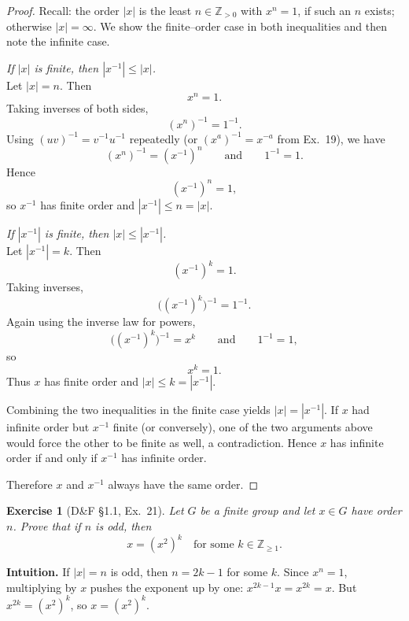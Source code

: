 \documentclass[12pt]{article}
\newtheorem{exercise}[theorem]{Exercise}
\theoremstyle{definition}
\begin{document}
\begin{proof}
Recall: the order $|x|$ is the least $n\in\mathbb{Z}_{>0}$ with $x^n=1$, if such an $n$ exists; otherwise $|x|=\infty$.
We show the finite–order case in both inequalities and then note the infinite case.

\dotfill

\noindent\emph{If $|x|$ is finite, then $|x^{-1}|\le |x|$.}\\

\noindent
Let $|x|=n$. Then
\[
x^n=1.
\]
Taking inverses of both sides,
\[
(x^n)^{-1}=1^{-1}.
\]
Using $(uv)^{-1}=v^{-1}u^{-1}$ repeatedly (or $(x^a)^{-1}=x^{-a}$ from Ex.~19), we have
\[
(x^n)^{-1}=(x^{-1})^n
\qquad\text{and}\qquad
1^{-1}=1.
\]
Hence
\[
(x^{-1})^n=1,
\]
so $x^{-1}$ has finite order and $|x^{-1}|\le n=|x|$.

\dotfill

\noindent\emph{If $|x^{-1}|$ is finite, then $|x|\le |x^{-1}|$.}\\

\noindent
Let $|x^{-1}|=k$. Then
\[
(x^{-1})^k=1.
\]
Taking inverses,
\[
\bigl((x^{-1})^k\bigr)^{-1}=1^{-1}.
\]
Again using the inverse law for powers,
\[
\bigl((x^{-1})^k\bigr)^{-1}=x^k
\qquad\text{and}\qquad
1^{-1}=1,
\]
so
\[
x^k=1.
\]
Thus $x$ has finite order and $|x|\le k=|x^{-1}|$.

\dotfill

Combining the two inequalities in the finite case yields $|x|=|x^{-1}|$. If $x$ had infinite order but $x^{-1}$ finite (or conversely), one of the two arguments above would force the other to be finite as well, a contradiction. Hence $x$ has infinite order if and only if $x^{-1}$ has infinite order.

\dotfill

\noindent
Therefore $x$ and $x^{-1}$ always have the same order.
\end{proof}

\newpage

\begin{exercise}[D\&F §1.1, Ex.~21]
Let $G$ be a finite group and let $x\in G$ have order $n$. Prove that if $n$ is odd, then
\[
x=(x^2)^k \quad\text{for some } k\in\mathbb{Z}_{\ge 1}.
\]
\end{exercise}

\dotfill

\noindent
\textbf{Intuition.}
If $|x|=n$ is odd, then $n=2k-1$ for some $k$. Since $x^n=1$, multiplying by $x$ pushes the exponent up by one:
$x^{2k-1}x=x^{2k}=x$. But $x^{2k}=(x^2)^k$, so $x=(x^2)^k$.
\end{document}
